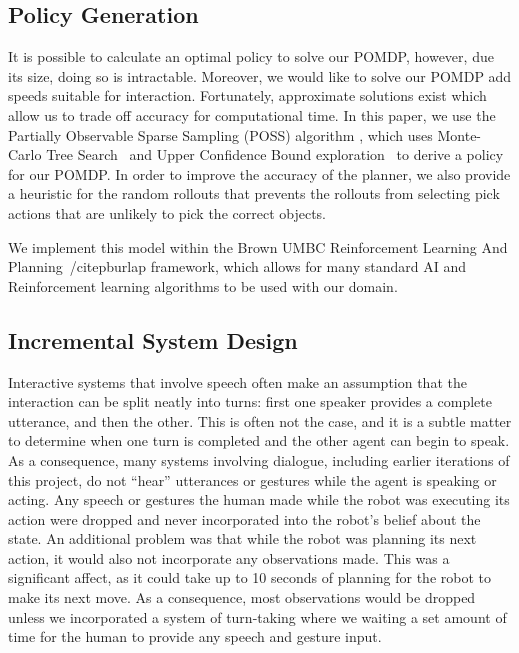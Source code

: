 \documentclass{article}
\begin{document}
\begin{multicols}{2}
\subsection{Policy Generation}

It is possible to calculate an optimal policy to solve our POMDP, however, due its size, doing so is intractable. Moreover, we would like to solve our POMDP add speeds suitable for interaction. Fortunately, approximate solutions exist which allow us to trade off accuracy for computational time. In this paper, we use the Partially Observable Sparse Sampling (POSS) algorithm \citep{Gopalan2016}, which uses Monte-Carlo Tree Search~\citep{coulom2006efficient} and Upper Confidence Bound exploration~\citep{kocsis2006bandit} to derive a policy for our POMDP. In order to improve the accuracy of the planner, we also provide a heuristic for the random rollouts that prevents the rollouts from selecting pick actions that are unlikely to pick the correct objects. 

We implement this model within the Brown UMBC Reinforcement Learning And Planning~/citep{burlap} framework, which allows for many standard AI and Reinforcement learning algorithms to be used with our domain. 


\subsection{Incremental System Design}

Interactive systems that involve speech often make an assumption that the interaction can be split neatly into turns: first one speaker provides a complete utterance, and then the other. This is often not the case, and it is a subtle matter to determine when one turn is completed and the other agent can begin to speak. As a consequence, many systems involving dialogue, including earlier iterations of this project, do not ``hear'' utterances or gestures while the agent is speaking or acting. Any speech or gestures the human made while the robot was executing its action were dropped and never incorporated into the robot's belief about the state. An additional problem was that while the robot was planning its next action, it would also not incorporate any observations made. This was a significant affect, as it could take up to 10 seconds of planning for the robot to make its next move. As a consequence, most observations would be dropped unless we incorporated a system of turn-taking where we waiting a set amount of time for the human to provide any speech and gesture input. 


\end{multicols}
\end{document}
